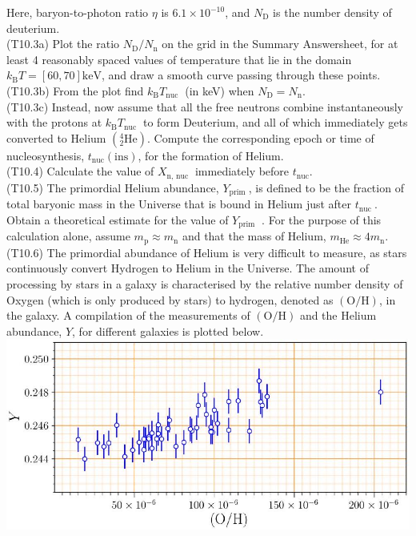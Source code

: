 \documentclass[10pt]{article}
\begin{document}
    Here, baryon-to-photon ratio $\eta$ is $6.1 \times 10^{-10}$, and $N_{\mathrm{D}}$ is the number density of deuterium.\\
    (T10.3a) Plot the ratio $N_{\mathrm{D}} / N_{\mathrm{n}}$ on the grid in the Summary Answersheet, for at least 4 reasonably spaced values of temperature that lie in the domain $k_{\mathrm{B}} T=[60,70] \mathrm{keV}$, and draw a smooth curve passing through these points.\\
    (T10.3b) From the plot find $k_{\mathrm{B}} T_{\text {nuc }}$ (in keV) when $N_{\mathrm{D}}=N_{\mathrm{n}}$.\\
    (T10.3c) Instead, now assume that all the free neutrons combine instantaneously with the protons at $k_{\mathrm{B}} T_{\text {nuc }}$ to form Deuterium, and all of which immediately gets converted to Helium $\left({ }_{2}^{4} \mathrm{He}\right)$. Compute the corresponding epoch or time of nucleosynthesis, $t_{\mathrm{nuc}}(\mathrm{in} \mathrm{s})$, for the formation of Helium.\\
    (T10.4) Calculate the value of $X_{\mathrm{n} \text {, nuc }}$ immediately before $t_{\mathrm{nuc}}$.\\
    (T10.5) The primordial Helium abundance, $Y_{\text {prim }}$, is defined to be the fraction of total baryonic mass in the Universe that is bound in Helium just after $t_{\text {nuc }}$. Obtain a theoretical estimate for the value of $Y_{\text {prim }}$ . For the purpose of this calculation alone, assume $m_{\mathrm{p}} \approx m_{\mathrm{n}}$ and that the mass of Helium, $m_{\mathrm{He}} \approx 4 m_{\mathrm{n}}$.\\
    (T10.6) The primordial abundance of Helium is very difficult to measure, as stars continuously convert Hydrogen to Helium in the Universe. The amount of processing by stars in a galaxy is characterised by the relative number density of Oxygen (which is only produced by stars) to hydrogen, denoted as $(\mathrm{O} / \mathrm{H})$, in the galaxy. A compilation of the measurements of $(\mathrm{O} / \mathrm{H})$ and the Helium abundance, $Y$, for different galaxies is plotted below.\\
    \includegraphics[max width=\textwidth, center]{2025_08_23_e94579452776a99c4850g-13}
    
\end{document}

